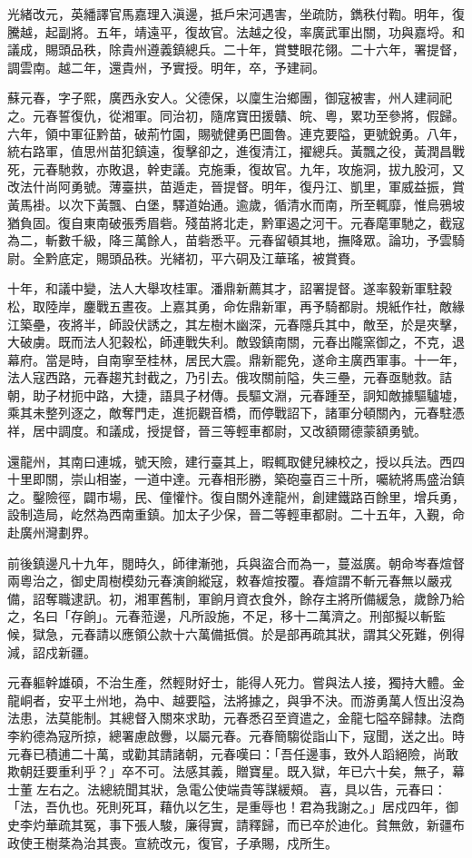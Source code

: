 \begin{pinyinscope}
光緒改元，英繙譯官馬嘉理入滇邊，抵戶宋河遇害，坐疏防，鐫秩付鞫。明年，復騰越，起副將。五年，靖遠平，復故官。法越之役，率廣武軍出關，功與嘉埒。和議成，賜頭品秩，除貴州遵義鎮總兵。二十年，賞雙眼花翎。二十六年，署提督，調雲南。越二年，還貴州，予實授。明年，卒，予建祠。

蘇元春，字子熙，廣西永安人。父德保，以廩生治鄉團，御寇被害，州人建祠祀之。元春誓復仇，從湘軍。同治初，隨席寶田援贛、皖、粵，累功至參將，假歸。六年，領中軍征黔苗，破荊竹園，賜號健勇巴圖魯。連克要隘，更號銳勇。八年，統右路軍，值思州苗犯鎮遠，復擊卻之，進復清江，擢總兵。黃飄之役，黃潤昌戰死，元春馳救，亦敗退，幹吏議。克施秉，復故官。九年，攻施洞，拔九股河，又改法什尚阿勇號。薄臺拱，苗遁走，晉提督。明年，復丹江、凱里，軍威益振，賞黃馬褂。以次下黃飄、白堡，驛道始通。逾歲，循清水而南，所至輒靡，惟烏鴉坡猶負固。復自東南破張秀眉砦。殘苗將北走，黔軍遏之河干。元春麾軍馳之，截寇為二，斬數千級，降三萬餘人，苗砦悉平。元春留頓其地，撫降眾。論功，予雲騎尉。全黔底定，賜頭品秩。光緒初，平六硐及江華瑤，被賞賚。

十年，和議中變，法人大舉攻桂軍。潘鼎新薦其才，詔署提督。遂率毅新軍駐穀松，取陸岸，鏖戰五晝夜。上嘉其勇，命佐鼎新軍，再予騎都尉。規紙作社，敵緣江築壘，夜將半，師設伏誘之，其左樹木幽深，元春隱兵其中，敵至，於是夾擊，大破虜。既而法人犯穀松，師連戰失利。敵毀鎮南關，元春出隴窯御之，不克，退幕府。當是時，自南寧至桂林，居民大震。鼎新罷免，遂命主廣西軍事。十一年，法人寇西路，元春趨艽封截之，乃引去。俄攻關前隘，失三壘，元春亟馳救。詰朝，助子材扼中路，大捷，語具子材傳。長驅文淵，元春踵至，詗知敵據驅驢墟，乘其未整列逐之，敵奪門走，進扼觀音橋，而停戰詔下，諸軍分頓關內，元春駐憑祥，居中調度。和議成，授提督，晉三等輕車都尉，又改額爾德蒙額勇號。

還龍州，其南曰連城，號天險，建行臺其上，暇輒取健兒練校之，授以兵法。西四十里即關，崇山相崟，一道中達。元春相形勝，築砲臺百三十所，囑統將馬盛治鎮之。鑿險徑，闢市場，民、僮懽忭。復自關外達龍州，創建鐵路百餘里，增兵勇，設制造局，屹然為西南重鎮。加太子少保，晉二等輕車都尉。二十五年，入覲，命赴廣州灣劃界。

前後鎮邊凡十九年，閱時久，師律漸弛，兵與盜合而為一，蔓滋廣。朝命岑春煊督兩粵治之，御史周樹模劾元春演餉縱寇，敕春煊按覆。春煊謂不斬元春無以嚴戎備，詔奪職逮訊。初，湘軍舊制，軍餉月資衣食外，餘存主將所備緩急，歲餘乃給之，名曰「存餉」。元春蒞邊，凡所設施，不足，移十二萬濟之。刑部擬以斬監候，獄急，元春請以應領公款十六萬備抵償。於是部再疏其狀，謂其父死難，例得減，詔戍新疆。

元春軀幹雄碩，不治生產，然輕財好士，能得人死力。嘗與法人接，獨持大體。金龍峒者，安平土州地，為中、越要隘，法將據之，與爭不決。而游勇萬人恆出沒為法患，法莫能制。其總督入關來求助，元春悉召至資遣之，金龍七隘卒歸隸。法商李約德為寇所掠，總署慮啟釁，以屬元春。元春簡騶從詣山下，寇聞，送之出。時元春已積逋二十萬，或勸其請諸朝，元春嘆曰：「吾任邊事，致外人蹈絕險，尚敢欺朝廷要重利乎？」卒不可。法感其義，贈寶星。既入獄，年已六十矣，無子，幕士董左右之。法總統聞其狀，急電公使端貴等謀緩頰。喜，具以告，元春曰：「法，吾仇也。死則死耳，藉仇以乞生，是重辱也！君為我謝之。」居戍四年，御史李灼華疏其冤，事下張人駿，廉得實，請釋歸，而已卒於迪化。貧無斂，新疆布政使王樹棻為治其喪。宣統改元，復官，子承賜，戍所生。


\end{pinyinscope}
